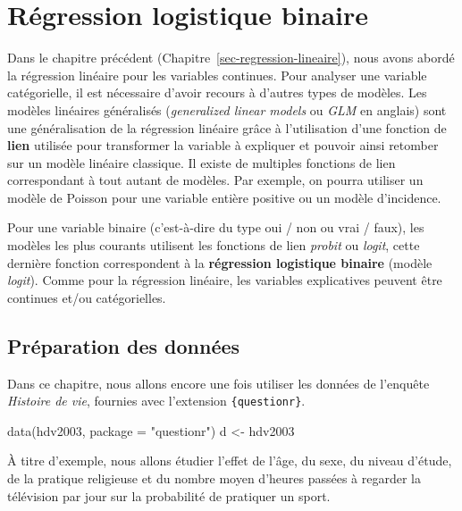 \documentclass[
  letterpaper,
  DIV=11,
  numbers=noendperiod,
  oneside]{scrreprt}
\newenvironment{Shaded}{\begin{snugshade}}{\end{snugshade}}
\newcommand{\AttributeTok}[1]{\textcolor[rgb]{0.40,0.45,0.13}{#1}}
\newcommand{\FunctionTok}[1]{\textcolor[rgb]{0.28,0.35,0.67}{#1}}
\newcommand{\NormalTok}[1]{\textcolor[rgb]{0.00,0.23,0.31}{#1}}
\newcommand{\OtherTok}[1]{\textcolor[rgb]{0.00,0.23,0.31}{#1}}
\newcommand{\StringTok}[1]{\textcolor[rgb]{0.13,0.47,0.30}{#1}}
\begin{document}
\hypertarget{sec-regression-logistique-binaire}{%
\chapter{Régression logistique
binaire}\label{sec-regression-logistique-binaire}}

Dans le chapitre précédent (Chapitre~\ref{sec-regression-lineaire}),
nous avons abordé la régression linéaire pour les variables continues.
Pour analyser une variable catégorielle, il est nécessaire d'avoir
recours à d'autres types de modèles. Les modèles linéaires généralisés
(\emph{generalized linear models} ou \emph{GLM} en anglais) sont une
généralisation de la régression linéaire grâce à l'utilisation d'une
fonction de \textbf{lien} utilisée pour transformer la variable à
expliquer et pouvoir ainsi retomber sur un modèle linéaire classique. Il
existe de multiples fonctions de lien correspondant à tout autant de
modèles. Par exemple, on pourra utiliser un modèle de Poisson pour une
variable entière positive ou un modèle d'incidence.

Pour une variable binaire (c'est-à-dire du type oui / non ou vrai /
faux), les modèles les plus courants utilisent les fonctions de lien
\emph{probit} ou \emph{logit}, cette dernière fonction correspondent à
la \textbf{régression logistique binaire} (modèle \emph{logit}). Comme
pour la régression linéaire, les variables explicatives peuvent être
continues et/ou catégorielles.

\hypertarget{pruxe9paration-des-donnuxe9es}{%
\section{Préparation des données}\label{pruxe9paration-des-donnuxe9es}}

Dans ce chapitre, nous allons encore une fois utiliser les données de
l'enquête \emph{Histoire de vie}, fournies avec l'extension
\texttt{\{questionr\}}.

\begin{Shaded}
\begin{Highlighting}[]
\FunctionTok{data}\NormalTok{(hdv2003, }\AttributeTok{package =} \StringTok{"questionr"}\NormalTok{)}
\NormalTok{d }\OtherTok{\textless{}{-}}\NormalTok{ hdv2003}
\end{Highlighting}
\end{Shaded}

À titre d'exemple, nous allons étudier l'effet de l'âge, du sexe, du
niveau d'étude, de la pratique religieuse et du nombre moyen d'heures
passées à regarder la télévision par jour sur la probabilité de
pratiquer un sport.
\end{document}
